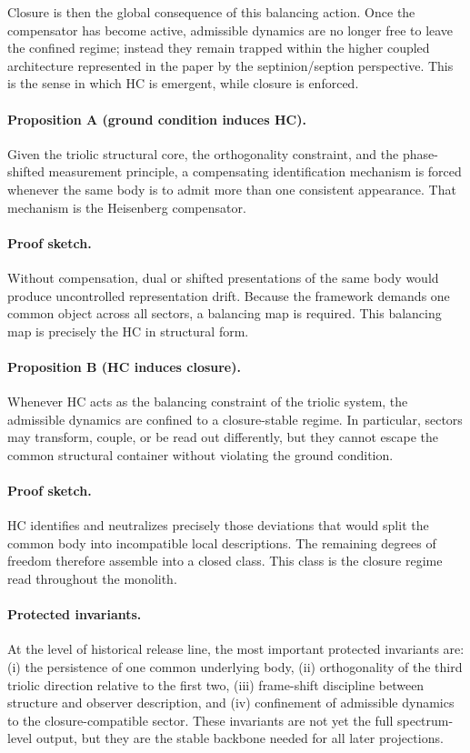\documentclass[12pt,a4paper]{article}
\DeclareRobustCommand{\QSCver}[1]{archival stage}
\renewcommand{\QSCver}[1]{historical release line}
\begin{document}
Closure is then the global consequence of this balancing action. Once the
compensator has become active, admissible dynamics are no longer free to leave
the confined regime; instead they remain trapped within the higher coupled
architecture represented in the paper by the septinion/seption perspective.
This is the sense in which HC is emergent, while closure is enforced.

\paragraph{Proposition A (ground condition induces HC).}
Given the triolic structural core, the orthogonality constraint, and the
phase-shifted measurement principle, a compensating identification mechanism is
forced whenever the same body is to admit more than one consistent appearance.
That mechanism is the Heisenberg compensator.

\paragraph{Proof sketch.}
Without compensation, dual or shifted presentations of the same body would
produce uncontrolled representation drift. Because the framework demands one
common object across all sectors, a balancing map is required. This balancing
map is precisely the HC in structural form.

\paragraph{Proposition B (HC induces closure).}
Whenever HC acts as the balancing constraint of the triolic system, the
admissible dynamics are confined to a closure-stable regime. In particular,
sectors may transform, couple, or be read out differently, but they cannot
escape the common structural container without violating the ground condition.

\paragraph{Proof sketch.}
HC identifies and neutralizes precisely those deviations that would split the
common body into incompatible local descriptions. The remaining degrees of
freedom therefore assemble into a closed class. This class is the closure
regime read throughout the monolith.

\paragraph{Protected invariants.}
At the level of \QSCver{v1.2.0}, the most important protected invariants are:
(i) the persistence of one common underlying body, (ii) orthogonality of the
third triolic direction relative to the first two, (iii) frame-shift discipline
between structure and observer description, and (iv) confinement of admissible
dynamics to the closure-compatible sector. These invariants are not yet the
full spectrum-level output, but they are the stable backbone needed for all
later projections.
\end{document}
